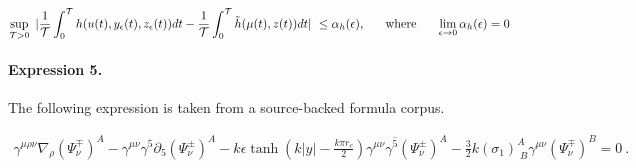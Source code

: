 \documentclass[11pt]{article}
\begin{document}
\begin{align*} \sup_{\mathcal{T}>0}\ |\frac{1}{\mathcal{T}}\int_0^{\mathcal{T}} h(u(t),y_{\epsilon}(t),z_{\epsilon}(t))dt - \frac{1}{\mathcal{T}}\int_0^{\mathcal{T}}\tilde h(\mu(t),z(t))dt|\ \leq \alpha_h (\epsilon ), \ \ \ \ \ {\rm where} \ \ \ \ \ \lim_{\epsilon\rightarrow 0}\alpha_h (\epsilon) = 0\end{align*}

\paragraph{Expression 5.} The following expression is taken from a source-backed formula corpus.

\begin{align*}\gamma^{\mu\rho\nu}\nabla_{\rho}(\Psi^\mp_{\nu})^{A}-\gamma^{\mu\nu}\gamma^{5}\partial_{5}(\Psi^\pm_{\nu})^{A}-k\epsilon\tanh\left(k|y|-\frac{k\pi r_{c}}{2}\right)\gamma^{\mu\nu}\gamma^{\hat{5}}(\Psi^\pm_{\nu})^{A}-\frac{3}{2}k(\sigma_1)^{A}_{\;B}\gamma^{\mu\nu}(\Psi^\mp_{\nu})^{B}=0\ .\end{align*}
\end{document}
